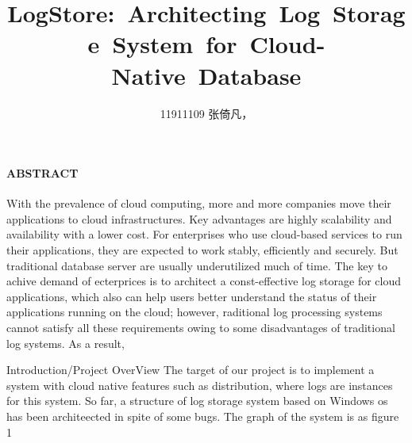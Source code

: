 \documentclass[UTF8, 11pt, twocolumn]{ctexart}
\title{LogStore: Architecting Log Storage System for Cloud-Native Database}
\author{
  11911109 张倚凡，
}
\makeatletter
\renewcommand{\section}{\@startsection{section}{1}{0mm}
  {0.5\baselineskip}{0.5\baselineskip}{\bf\leftline}}
\makeatother
\begin{document}
    \maketitle
    \paragraph{ABSTRACT}\par
        With the prevalence of cloud computing, more and more companies move their applications to cloud infrastructures. Key advantages are highly scalability 
        and availability with a lower cost. For enterprises who use cloud-based services to run their applications, they are expected to work stably, efficiently 
        and securely. But traditional database server are usually underutilized much of time. The key to achive demand of ecterprices is to architect a 
        const-effective log storage for cloud applications, which also can help users better understand the status of their applications running on the cloud; 
        however, raditional log processing systems cannot satisfy all these requirements owing to some disadvantages of traditional log systems. As a result, 

    \section{Introduction/Project OverView}
        The target of our project is to implement a system with cloud native features such as distribution, where logs are instances for this system. So far, a 
        structure of log storage system based on Windows os has been architeected in spite of some bugs. The graph of the system is as figure 1
\end{document}
